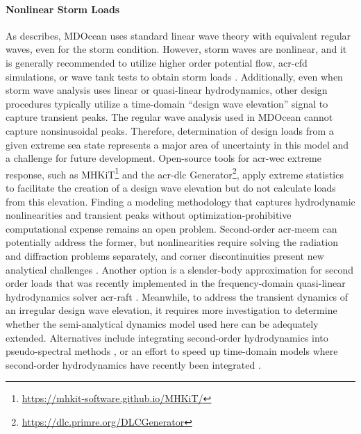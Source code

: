 \documentclass[a4paper,fleqn,colorlinks,unicode,lineno]{cas-dc} %
\begin{document}
    \paragraph{Nonlinear Storm Loads}
    As  describes, MDOcean uses standard linear wave theory with equivalent regular waves, even for the storm condition.
    However, storm waves are nonlinear, and it is generally recommended to utilize higher order potential flow, \gls{acr-cfd} simulations, or wave tank tests to obtain storm loads \citep{coe_survey_2018}.
    Additionally, even when storm wave analysis uses linear or quasi-linear hydrodynamics, other design procedures typically utilize a time-domain ``design wave elevation'' signal to capture transient peaks.
    The regular wave analysis used in MDOcean cannot capture nonsinusoidal peaks.
    Therefore, determination of design loads from a given extreme sea state represents a major area of uncertainty in this model and a challenge for future development.
    Open-source tools for \gls{acr-wec} extreme response, such as MHKiT\footnote{\url{https://mhkit-software.github.io/MHKiT/}} and the \gls{acr-dlc} Generator\footnote{\url{https://dlc.primre.org/DLCGenerator}}, apply extreme statistics to facilitate the creation of a design wave elevation but do not calculate loads from this elevation.
    Finding a modeling methodology that captures hydrodynamic nonlinearities and transient peaks without optimization-prohibitive computational expense remains an open problem.
    Second-order \gls{acr-meem} can potentially address the former, but nonlinearities require solving the radiation and diffraction problems separately, and corner discontinuities present new analytical challenges \citep{cong_novel_2020,mavrakos_second-order_2009}.
    Another option is a slender-body approximation for second order loads that was recently implemented in the frequency-domain quasi-linear hydrodynamics solver \gls{acr-raft} \citep{carmo_slender-body_2025}.
    Meanwhile, to address the transient dynamics of an irregular design wave elevation, it requires more investigation to determine whether the semi-analytical dynamics model used here can be adequately extended.
    Alternatives include integrating second-order hydrodynamics into pseudo-spectral methods \citep{coe_initial_2020}, or an effort to speed up time-domain models where second-order hydrodynamics have recently been integrated \citep{issoglio_second-order_2026}.
\end{document}
